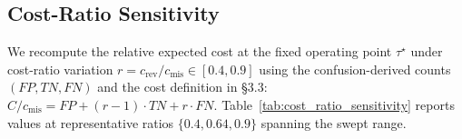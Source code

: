 \subsection{Cost-Ratio Sensitivity}
\label{app:cost_ratio_sensitivity}

We recompute the relative expected cost at the fixed operating point $\tau^\star$ under cost-ratio variation
$r=c_{\text{rev}}/c_{\text{mis}}\in[0.4,0.9]$ using the confusion-derived counts $(FP,TN,FN)$ and the cost
definition in \S3.3: $C/c_{\text{mis}} = FP + (r-1)\cdot TN + r\cdot FN$.
Table~\ref{tab:cost_ratio_sensitivity} reports values at representative ratios $\{0.4,0.64,0.9\}$ spanning the swept range.

\begin{table}[t]
\centering
\caption{Cost-ratio sensitivity analysis. Relative expected cost $C(\tau^\star)/c_{\text{mis}}$ recomputed for cost ratios $r = c_{\text{rev}}/c_{\text{mis}} \in [0.4, 0.9]$, reported at representative values $\{0.4, 0.64, 0.9\}$ (range endpoints and baseline).}
\label{tab:cost_ratio_sensitivity}

\small
\setlength{\tabcolsep}{4pt}
\renewcommand{\arraystretch}{1.05}


\end{table}
